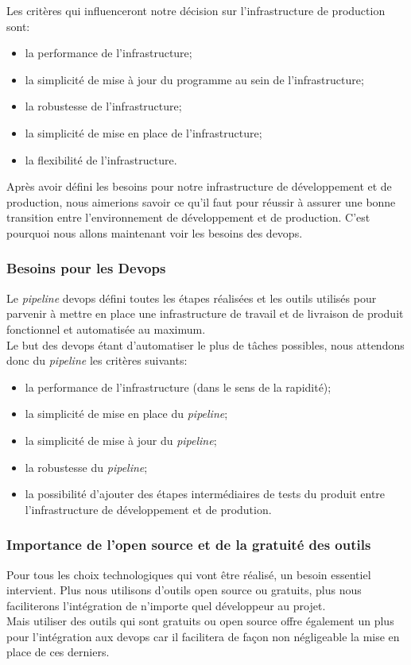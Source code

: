 \documentclass[
    iai, %
    il, %
]{heig-tb}
\begin{document}
Les critères qui influenceront notre décision sur l'infrastructure de production sont:
\begin{itemize}
    \item la performance de l'infrastructure;
    \item la simplicité de mise à jour du programme au sein de l'infrastructure;
    \item la robustesse de l'infrastructure;
    \item la simplicité de mise en place de l'infrastructure;
    \item la flexibilité de l'infrastructure.
\end{itemize}

Après avoir défini les besoins pour notre infrastructure de développement et de production, nous aimerions savoir ce qu'il faut pour réussir à assurer une bonne transition entre l'environnement de développement et de production. C'est pourquoi nous allons maintenant voir les besoins des \Gls{devops}.

\subsubsection{Besoins pour les Devops}
Le \emph{pipeline} \Gls{devops} défini toutes les étapes réalisées et les outils utilisés pour parvenir à mettre en place une infrastructure de travail et de livraison de produit fonctionnel et automatisée au maximum.\\
Le but des \Gls{devops} étant d'automatiser le plus de tâches possibles, nous attendons donc du \emph{pipeline} les critères suivants:
\begin{itemize}
    \item la performance de l'infrastructure (dans le sens de la rapidité);
    \item la simplicité de mise en place du \emph{pipeline};
    \item la simplicité de mise à jour du \emph{pipeline};
    \item la robustesse du \emph{pipeline};
    \item la possibilité d'ajouter des étapes intermédiaires de tests du produit entre l'infrastructure de développement et de prodution.
\end{itemize}

\subsubsection{Importance de l'open source et de la gratuité des outils}
Pour tous les choix technologiques qui vont être réalisé, un besoin essentiel intervient.
Plus nous utilisons d'outils open source ou gratuits, plus nous faciliterons l'intégration de n'importe quel développeur au projet.\\
Mais utiliser des outils qui sont gratuits ou open source offre également un plus pour l'intégration aux \Gls{devops} car il facilitera de façon non négligeable la mise en place de ces derniers.
\end{document}
